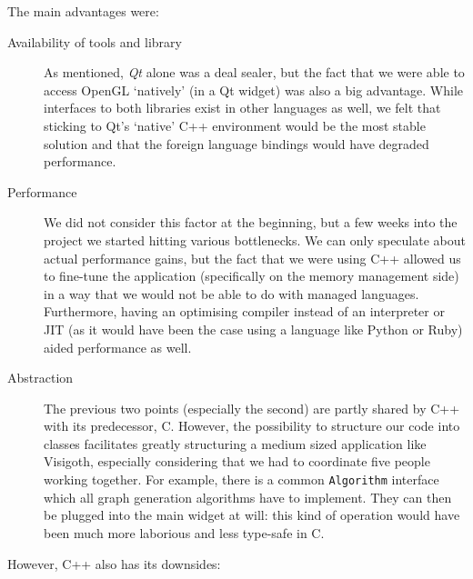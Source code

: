 \documentclass[a4paper,11pt,titlepage]{article}
\newcommand{\code}[1]{\texttt{#1}}
\newcommand{\buzz}[1]{\emph{#1}}
\begin{document}
The main advantages were:

\begin{description}

\item [Availability of tools and library] As mentioned, \buzz{Qt} alone
  was a deal sealer, but the fact that we were able to access OpenGL
  `natively' (in a Qt widget) was also a big advantage. While interfaces
  to both libraries exist in other languages as well, we felt that
  sticking to Qt's `native' C++ environment would be the most stable
  solution and that the foreign language bindings would have degraded
  performance.

\item [Performance] We did not consider this factor at the beginning,
  but a few weeks into the project we started hitting various
  bottlenecks. We can only speculate about actual performance gains,
  but the fact that we were using
  C++ allowed us to fine-tune the application (specifically on the
  memory management side) in a way that we would not be able to do
  with managed languages. Furthermore, having an optimising compiler
  instead of an interpreter or JIT (as it would have been the case
  using a language like Python or Ruby) aided performance as well.

\item [Abstraction] The previous two points (especially the second)
  are partly shared by C++ with its predecessor, C. However, the
  possibility to structure our code into classes facilitates greatly
  structuring a medium sized application like Visigoth, especially
  considering that we had to coordinate five people working together.
  For example, there is a common \code{Algorithm} interface which all
  graph generation algorithms have to implement. They can then
  be plugged into the main widget at will: this kind of operation
  would have been much more laborious and less type-safe in C.

\end{description}

However, C++ also has its downsides:
\end{document}
